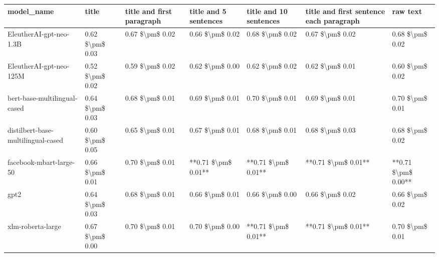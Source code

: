\begin{tabular}{lllllll}
\toprule
                        model\_name &           title & title and first paragraph & title and 5 sentences & title and 10 sentences & title and first sentence each paragraph &            raw text \\
\midrule
           EleutherAI-gpt-neo-1.3B & 0.62 \$\textbackslash pm\$ 0.03 &           0.67 \$\textbackslash pm\$ 0.02 &       0.66 \$\textbackslash pm\$ 0.02 &        0.68 \$\textbackslash pm\$ 0.02 &                         0.67 \$\textbackslash pm\$ 0.02 &     0.68 \$\textbackslash pm\$ 0.02 \\
           EleutherAI-gpt-neo-125M & 0.52 \$\textbackslash pm\$ 0.02 &           0.59 \$\textbackslash pm\$ 0.02 &       0.62 \$\textbackslash pm\$ 0.00 &        0.62 \$\textbackslash pm\$ 0.02 &                         0.62 \$\textbackslash pm\$ 0.01 &     0.60 \$\textbackslash pm\$ 0.02 \\
      bert-base-multilingual-cased & 0.64 \$\textbackslash pm\$ 0.03 &           0.68 \$\textbackslash pm\$ 0.01 &       0.69 \$\textbackslash pm\$ 0.01 &        0.70 \$\textbackslash pm\$ 0.01 &                         0.69 \$\textbackslash pm\$ 0.01 &     0.70 \$\textbackslash pm\$ 0.01 \\
distilbert-base-multilingual-cased & 0.60 \$\textbackslash pm\$ 0.05 &           0.65 \$\textbackslash pm\$ 0.01 &       0.67 \$\textbackslash pm\$ 0.01 &        0.68 \$\textbackslash pm\$ 0.01 &                         0.68 \$\textbackslash pm\$ 0.03 &     0.68 \$\textbackslash pm\$ 0.02 \\
           facebook-mbart-large-50 & 0.66 \$\textbackslash pm\$ 0.01 &           0.70 \$\textbackslash pm\$ 0.01 &   **0.71 \$\textbackslash pm\$ 0.01** &    **0.71 \$\textbackslash pm\$ 0.01** &                     **0.71 \$\textbackslash pm\$ 0.01** & **0.71 \$\textbackslash pm\$ 0.00** \\
                              gpt2 & 0.64 \$\textbackslash pm\$ 0.03 &           0.68 \$\textbackslash pm\$ 0.01 &       0.66 \$\textbackslash pm\$ 0.01 &        0.66 \$\textbackslash pm\$ 0.00 &                         0.66 \$\textbackslash pm\$ 0.02 &     0.66 \$\textbackslash pm\$ 0.02 \\
                 xlm-roberta-large & 0.67 \$\textbackslash pm\$ 0.00 &           0.70 \$\textbackslash pm\$ 0.01 &       0.70 \$\textbackslash pm\$ 0.00 &    **0.71 \$\textbackslash pm\$ 0.01** &                     **0.71 \$\textbackslash pm\$ 0.01** &     0.70 \$\textbackslash pm\$ 0.01 \\
\bottomrule
\end{tabular}

